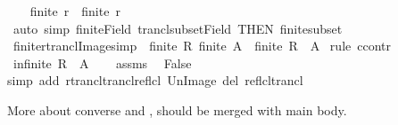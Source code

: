 \begin{isabellebody}
\ \ \isamarkupfalse%
\ {\isachardoublequoteopen}finite\ r\ {\isasymLongrightarrow}\ finite\ {\isacharparenleft}{\kern0pt}r\isactrlsup {\isacharplus}{\kern0pt}{\isacharparenright}{\kern0pt}{\isachardoublequoteclose}\isanewline
\ \ \ \ \isamarkupfalse%
\ {\isacharparenleft}{\kern0pt}auto\ simp{\isacharcolon}{\kern0pt}\ finite{\isacharunderscore}{\kern0pt}Field\ trancl{\isacharunderscore}{\kern0pt}subset{\isacharunderscore}{\kern0pt}Field{}\ {\isacharbrackleft}{\kern0pt}THEN\ finite{\isacharunderscore}{\kern0pt}subset{\isacharbrackright}{\kern0pt}{\isacharparenright}{\kern0pt}\isanewline
{}\isamarkupfalse%
%
\endisatagproof
{\isafoldproof}%
%
\isadelimproof
\isanewline
%
\endisadelimproof
\isanewline
{}\isamarkupfalse%
\ finite{\isacharunderscore}{\kern0pt}rtrancl{\isacharunderscore}{\kern0pt}Image{\isacharbrackleft}{\kern0pt}simp{\isacharbrackright}{\kern0pt}{\isacharcolon}{\kern0pt}\ \ {\isachardoublequoteopen}finite\ R{\isachardoublequoteclose}\ {\isachardoublequoteopen}finite\ A{\isachardoublequoteclose}\ \ {\isachardoublequoteopen}finite\ {\isacharparenleft}{\kern0pt}R\isactrlsup {\isacharasterisk}{\kern0pt}\ {\isacharbackquote}{\kern0pt}{\isacharbackquote}{\kern0pt}\ A{\isacharparenright}{\kern0pt}{\isachardoublequoteclose}\isanewline
%
\isadelimproof
%
\endisadelimproof
%
\isatagproof
{}\isamarkupfalse%
\ {\isacharparenleft}{\kern0pt}rule\ ccontr{\isacharparenright}{\kern0pt}\isanewline
\ \ \isamarkupfalse%
\ {\isachardoublequoteopen}infinite\ {\isacharparenleft}{\kern0pt}R\isactrlsup {\isacharasterisk}{\kern0pt}\ {\isacharbackquote}{\kern0pt}{\isacharbackquote}{\kern0pt}\ A{\isacharparenright}{\kern0pt}{\isachardoublequoteclose}\isanewline
\ \ \isamarkupfalse%
\ assms\ \isamarkupfalse%
\ False\isanewline
\ \ \ \ \isamarkupfalse%
{\isacharparenleft}{\kern0pt}simp\ add{\isacharcolon}{\kern0pt}\ rtrancl{\isacharunderscore}{\kern0pt}trancl{\isacharunderscore}{\kern0pt}reflcl\ Un{\isacharunderscore}{\kern0pt}Image\ del{\isacharcolon}{\kern0pt}\ reflcl{\isacharunderscore}{\kern0pt}trancl{\isacharparenright}{\kern0pt}\isanewline
{}\isamarkupfalse%
%
\endisatagproof
{\isafoldproof}%
%
\isadelimproof
%
\endisadelimproof
%
\begin{isamarkuptext}%
More about converse  and , should
  be merged with main body.%
\end{isamarkuptext}\isamarkuptrue%
\isamarkupfalse%

\end{isabellebody}
